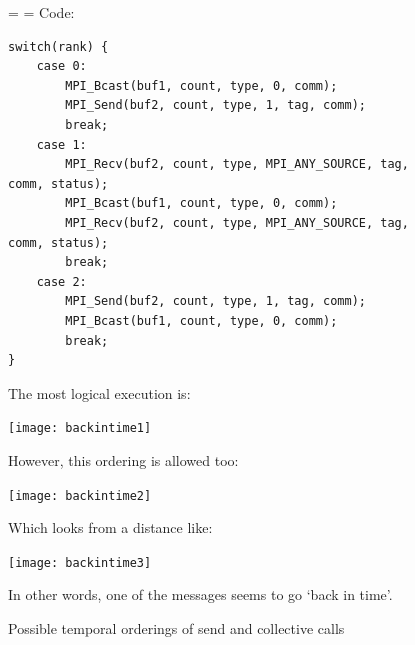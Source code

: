 \begin{figure}[p]
  \footnotesize
  \leftskip=\unitindent
  \rightskip=\unitindent
Code:
{\tiny
\begin{lstlisting}
switch(rank) { 
    case 0: 
        MPI_Bcast(buf1, count, type, 0, comm); 
        MPI_Send(buf2, count, type, 1, tag, comm); 
        break; 
    case 1: 
        MPI_Recv(buf2, count, type, MPI_ANY_SOURCE, tag, comm, status); 
        MPI_Bcast(buf1, count, type, 0, comm); 
        MPI_Recv(buf2, count, type, MPI_ANY_SOURCE, tag, comm, status); 
        break; 
    case 2: 
        MPI_Send(buf2, count, type, 1, tag, comm); 
        MPI_Bcast(buf1, count, type, 0, comm); 
        break; 
}
\end{lstlisting}
}
The most logical execution is:\par\medskip

\texttt{[image: backintime1]}

However, this ordering is allowed too:\par\medskip

\texttt{[image: backintime2]}

Which looks from a distance like:\par\medskip

\texttt{[image: backintime3]}

In other words, one of the messages seems to go `back in time'.

  \caption{Possible temporal orderings of send and collective calls}
  \label{fig:backintime}
\end{figure}

